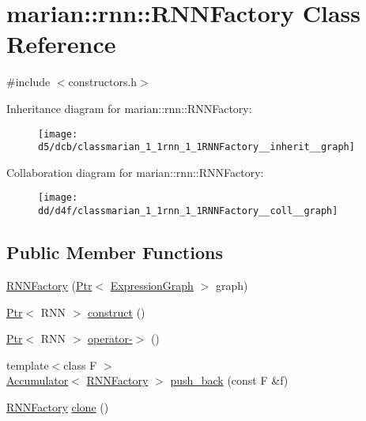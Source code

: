\hypertarget{classmarian_1_1rnn_1_1RNNFactory}{}\section{marian\+:\+:rnn\+:\+:R\+N\+N\+Factory Class Reference}
\label{classmarian_1_1rnn_1_1RNNFactory}


{\ttfamily \#include $<$constructors.\+h$>$}



Inheritance diagram for marian\+:\+:rnn\+:\+:R\+N\+N\+Factory\+:
\nopagebreak
\begin{figure}[H]
\begin{center}
\leavevmode
\texttt{[image: d5/dcb/classmarian\_1\_1rnn\_1\_1RNNFactory\_\_inherit\_\_graph]}
\end{center}
\end{figure}


Collaboration diagram for marian\+:\+:rnn\+:\+:R\+N\+N\+Factory\+:
\nopagebreak
\begin{figure}[H]
\begin{center}
\leavevmode
\texttt{[image: dd/d4f/classmarian\_1\_1rnn\_1\_1RNNFactory\_\_coll\_\_graph]}
\end{center}
\end{figure}
\subsection*{Public Member Functions}
\begin{DoxyCompactItemize}
\item 
\hyperlink{classmarian_1_1rnn_1_1RNNFactory_a32d3269b5b22dea0df81cbafe5837afc}{R\+N\+N\+Factory} (\hyperlink{namespacemarian_ad1a373be43a00ef9ce35666145137b08}{Ptr}$<$ \hyperlink{classmarian_1_1ExpressionGraph}{Expression\+Graph} $>$ graph)
\item 
\hyperlink{namespacemarian_ad1a373be43a00ef9ce35666145137b08}{Ptr}$<$ R\+NN $>$ \hyperlink{classmarian_1_1rnn_1_1RNNFactory_a91f14f73bcd34cbb89a8c4312ab0856f}{construct} ()
\item 
\hyperlink{namespacemarian_ad1a373be43a00ef9ce35666145137b08}{Ptr}$<$ R\+NN $>$ \hyperlink{classmarian_1_1rnn_1_1RNNFactory_ae647cee723e7f64426034148056eb97e}{operator-\/$>$} ()
\item 
{\footnotesize template$<$class F $>$ }\\\hyperlink{classmarian_1_1Accumulator}{Accumulator}$<$ \hyperlink{classmarian_1_1rnn_1_1RNNFactory}{R\+N\+N\+Factory} $>$ \hyperlink{classmarian_1_1rnn_1_1RNNFactory_a9e63249dba7f6dc38f7cfc99429ae0c4}{push\+\_\+back} (const F \&f)
\item 
\hyperlink{classmarian_1_1rnn_1_1RNNFactory}{R\+N\+N\+Factory} \hyperlink{classmarian_1_1rnn_1_1RNNFactory_a3d879b73cb33a440604b610f21dd823a}{clone} ()
\end{DoxyCompactItemize}
